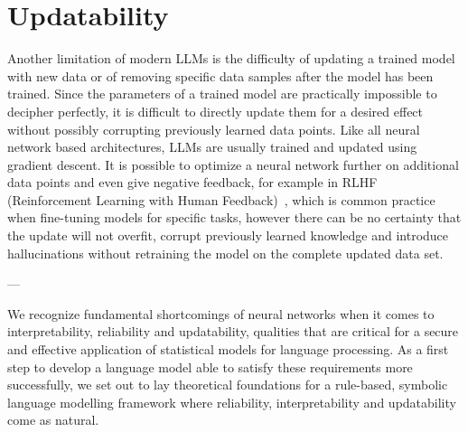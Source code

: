 \section{Updatability}
Another limitation of modern LLMs is the difficulty of updating a trained model with new data or of removing specific data samples after the model has been trained. Since the parameters of a trained model are practically impossible to decipher perfectly, it is difficult to directly update them for a desired effect without possibly corrupting previously learned data points. Like all neural network based architectures, LLMs are usually trained and updated using gradient descent. It is possible to optimize a neural network further on additional data points and even give negative feedback, for example in RLHF (Reinforcement Learning with Human Feedback)~\cite{christiano2017deep}, which is common practice when fine-tuning models for specific tasks, however there can be no certainty that the update will not overfit, corrupt previously learned knowledge and introduce hallucinations without retraining the model on the complete updated data set.

\begin{center}
    ---
\end{center}
\noindent
We recognize fundamental shortcomings of neural networks when it comes to interpretability, reliability and updatability, qualities that are critical for a secure and effective application of statistical models for language processing. As a first step to develop a language model able to satisfy these requirements more successfully, we set out to lay theoretical foundations for a rule-based, symbolic language modelling framework where reliability, interpretability and updatability come as natural.